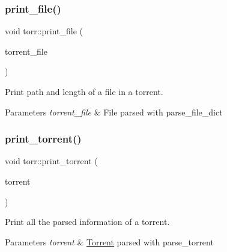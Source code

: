 \subsubsection{\texorpdfstring{print\+\_\+file()}{print\_file()}}
{\footnotesize\ttfamily void torr\+::print\+\_\+file (\begin{DoxyParamCaption}\item[{const \hyperlink{structtorr_1_1TorrentFile}{Torrent\+File} \&}]{torrent\+\_\+file }\end{DoxyParamCaption})}



Print path and length of a file in a torrent. 


\begin{DoxyParams}{Parameters}
{\em torrent\+\_\+file} & File parsed with parse\+\_\+file\+\_\+dict \\
\hline
\end{DoxyParams}
\mbox{\label{namespacetorr_a8f9d5e0b3e7590d0dd115cda74088eef}} 
\subsubsection{\texorpdfstring{print\+\_\+torrent()}{print\_torrent()}}
{\footnotesize\ttfamily void torr\+::print\+\_\+torrent (\begin{DoxyParamCaption}\item[{const \hyperlink{structtorr_1_1Torrent}{Torrent} \&}]{torrent }\end{DoxyParamCaption})}



Print all the parsed information of a torrent. 


\begin{DoxyParams}{Parameters}
{\em torrent} & \hyperlink{structtorr_1_1Torrent}{Torrent} parsed with parse\+\_\+torrent \\
\hline
\end{DoxyParams}
